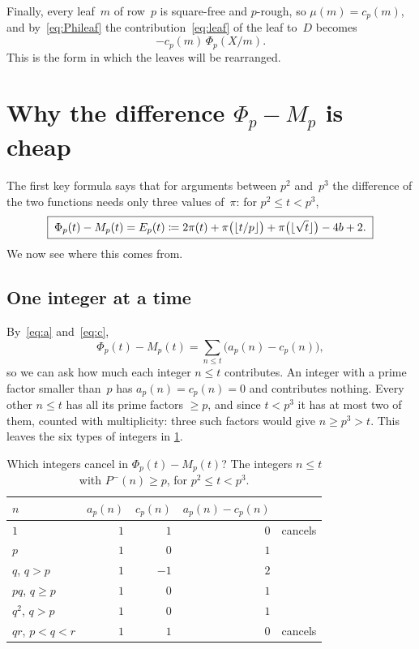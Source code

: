 \documentclass[11pt,a4paper]{amsart}
\numberwithin{equation}{section}
\DeclarePairedDelimiter{\floor}{\lfloor}{\rfloor}
\newcommand{\Pminus}{P^{-}}
\begin{document}
Finally, every leaf~$m$ of row~$p$ is square-free and $p$-rough, so
$\mu(m)=c_p(m)$, and by~\eqref{eq:Phileaf} the contribution~\eqref{eq:leaf}
of the leaf to~$D$ becomes
\begin{equation}\label{eq:leafterm}
  -c_p(m)\,\Phi_p(X/m).
\end{equation}
This is the form in which the leaves will be rearranged.

\section{Why the difference \texorpdfstring{$\Phi_p-M_p$}{Φp − Mp} is cheap}\label{sec:cheap}

The first key formula says that for arguments between $p^2$ and~$p^3$ the
difference of the two functions needs only three values of~$\pi$: for
$p^2\le t<p^3$,
\begin{equation}\label{eq:E}
  \boxed{\;\Phi_p(t)-M_p(t)=E_p(t)\coloneqq 2\pi(t)+\pi\bigl(\floor{t/p}\bigr)
  +\pi\bigl(\floor{\sqrt t}\bigr)-4b+2.\;}
\end{equation}
We now see where this comes from.

\subsection{One integer at a time}
By~\eqref{eq:a} and~\eqref{eq:c},
\[
  \Phi_p(t)-M_p(t)=\sum_{n\le t}\bigl(a_p(n)-c_p(n)\bigr),
\]
so we can ask how much each integer $n\le t$ contributes. An integer with a
prime factor smaller than~$p$ has $a_p(n)=c_p(n)=0$ and contributes nothing.
Every other $n\le t$ has all its prime factors $\ge p$, and since $t<p^3$ it
has at most two of them, counted with multiplicity: three such factors would
give $n\ge p^3>t$. This leaves the six types of integers in
\cref{tab:cancel}.

\begin{table}[htb]
\caption{Which integers cancel in $\Phi_p(t)-M_p(t)$? The integers $n\le t$ with
$\Pminus(n)\ge p$, for $p^2\le t<p^3$.}\label{tab:cancel}
\centering
\begin{tabular}{@{}lrrrl@{}}
\toprule
$n$ & $a_p(n)$ & $c_p(n)$ & $a_p(n)-c_p(n)$ & \\
\midrule
$1$ & $1$ & $1$ & $0$ & cancels\\
$p$ & $1$ & $0$ & $1$ & \\
$q$, $q>p$ & $1$ & $-1$ & $2$ & \\
$pq$, $q\ge p$ & $1$ & $0$ & $1$ & \\
$q^2$, $q>p$ & $1$ & $0$ & $1$ & \\
$qr$, $p<q<r$ & $1$ & $1$ & $0$ & cancels\\
\bottomrule
\end{tabular}
\end{table}
\end{document}
